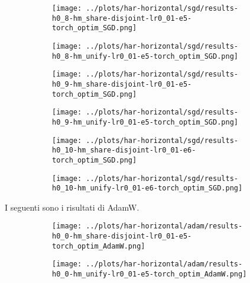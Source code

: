\begin{figure}[htbp]  %
    \centering
    \begin{subfigure}[b]{0.47\textwidth}
        \centering
        \texttt{[image: ../plots/har-horizontal/sgd/results-h0\_8-hm\_share-disjoint-lr0\_01-e5-torch\_optim\_SGD.png]}
    \end{subfigure}
    \hfill
    \begin{subfigure}[b]{0.47\textwidth}
        \centering
        \texttt{[image: ../plots/har-horizontal/sgd/results-h0\_8-hm\_unify-lr0\_01-e5-torch\_optim\_SGD.png]}
    \end{subfigure}
\end{figure}
\begin{figure}[htbp]  %
    \centering
    \begin{subfigure}[b]{0.47\textwidth}
        \centering
        \texttt{[image: ../plots/har-horizontal/sgd/results-h0\_9-hm\_share-disjoint-lr0\_01-e5-torch\_optim\_SGD.png]}
    \end{subfigure}
    \hfill
    \begin{subfigure}[b]{0.47\textwidth}
        \centering
        \texttt{[image: ../plots/har-horizontal/sgd/results-h0\_9-hm\_unify-lr0\_01-e5-torch\_optim\_SGD.png]}
    \end{subfigure}
\end{figure}
\begin{figure}[htbp]  %
    \centering
    \begin{subfigure}[b]{0.47\textwidth}
        \centering
        \texttt{[image: ../plots/har-horizontal/sgd/results-h0\_10-hm\_share-disjoint-lr0\_01-e6-torch\_optim\_SGD.png]}
    \end{subfigure}
    \hfill
    \begin{subfigure}[b]{0.47\textwidth}
        \centering
        \texttt{[image: ../plots/har-horizontal/sgd/results-h0\_10-hm\_unify-lr0\_01-e6-torch\_optim\_SGD.png]}
    \end{subfigure}
\end{figure}
\clearpage
I seguenti sono i risultati di AdamW.
\begin{figure}[htbp]  %
    \centering
    \begin{subfigure}[b]{0.47\textwidth}
        \centering
        \texttt{[image: ../plots/har-horizontal/adam/results-h0\_0-hm\_share-disjoint-lr0\_01-e5-torch\_optim\_AdamW.png]}
    \end{subfigure}
    \hfill
    \begin{subfigure}[b]{0.47\textwidth}
        \centering
        \texttt{[image: ../plots/har-horizontal/adam/results-h0\_0-hm\_unify-lr0\_01-e5-torch\_optim\_AdamW.png]}
    \end{subfigure}
\end{figure}
